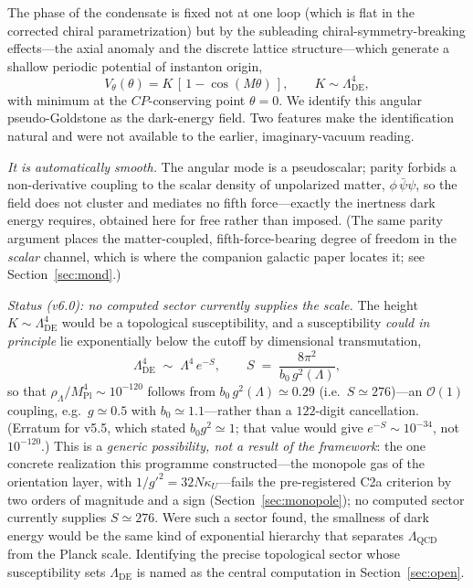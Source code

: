 \documentclass[11pt]{article}
\newcommand{\beq}{\begin{equation}}
\newcommand{\eeq}{\end{equation}}
\newcommand{\Mpl}{M_{\mathrm{Pl}}}
\newcommand{\rhoL}{\rho_\Lambda}
\newcommand{\LDE}{\Lambda_{\mathrm{DE}}}
\begin{document}
\label{sec:axion}

The phase of the condensate is fixed not at one loop (which is flat in
the corrected chiral parametrization) but by the subleading
chiral-symmetry-breaking effects---the axial anomaly and the discrete
lattice structure---which generate a shallow periodic potential of
instanton origin,
\beq
V_\theta(\theta) = K\,[\,1 - \cos(M\theta)\,],
\qquad K \sim \LDE^4 ,
\label{eq:Vtheta}
\eeq
with minimum at the $CP$-conserving point $\theta = 0$.  We identify
this angular pseudo-Goldstone as the dark-energy field.  Two features
make the identification natural and were not available to the earlier,
imaginary-vacuum reading.

\emph{It is automatically smooth.}  The angular mode is a pseudoscalar;
parity forbids a non-derivative coupling to the scalar density of
unpolarized matter, $\phi\,\bar\psi\psi$, so the field does not cluster
and mediates no fifth force---exactly the inertness dark energy
requires, obtained here for free rather than imposed.  (The same
parity argument places the matter-coupled, fifth-force-bearing degree
of freedom in the \emph{scalar} channel, which is where the companion
galactic paper locates it; see Section~\ref{sec:mond}.)

\emph{Status (v6.0): no computed sector currently supplies the
scale.}  The height $K\sim\LDE^4$ would be a topological
susceptibility, and a susceptibility \emph{could in principle} lie
exponentially below the cutoff by dimensional transmutation,
\beq
\LDE^4 \;\sim\; \Lambda^4\, e^{-S}, \qquad
S \;=\; \frac{8\pi^2}{b_0\, g^2(\Lambda)} ,
\label{eq:transmute}
\eeq
so that $\rhoL/\Mpl^4 \sim 10^{-120}$ follows from
$b_0\,g^2(\Lambda)\simeq 0.29$ (i.e.\ $S \simeq 276$)---an
$\mathcal{O}(1)$ coupling, e.g.\ $g \simeq 0.5$ with
$b_0 \simeq 1.1$---rather than a $122$-digit cancellation.
(Erratum for v5.5, which stated $b_0 g^2 \simeq 1$; that value
would give $e^{-S} \sim 10^{-34}$, not $10^{-120}$.)
This is a \emph{generic possibility, not a result of the framework}:
the one concrete realization this programme constructed---the
monopole gas of the orientation layer, with
$1/g'^2 = 32N\kappa_U$---fails the pre-registered C2a criterion by
two orders of magnitude and a sign (Section~\ref{sec:monopole}); no
computed sector currently supplies $S \simeq 276$.  Were such a
sector found, the smallness of dark energy would be the same kind of
exponential hierarchy that separates $\Lambda_{\mathrm{QCD}}$ from
the Planck
scale.  Identifying the precise topological sector whose susceptibility
sets $\LDE$ is named as the central computation in
Section~\ref{sec:open}.
\end{document}
